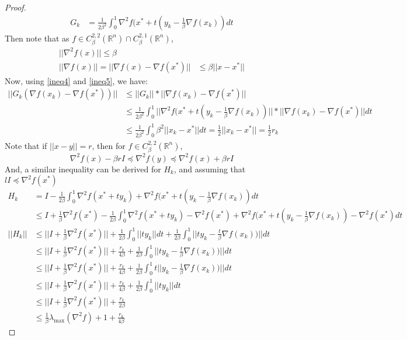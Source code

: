 \documentclass[12pt,twoside]{article}
\begin{document}
\begin{proof}
\begin{equation}
\begin{aligned}
G_k &= \frac{1}{2\beta^2} \int_0^1 \nabla^2 f(x^* + t(y_k - \frac{1}{\beta} \nabla f(x_k)) dt
\end{aligned}
\end{equation}
Then note that as $f \in C_{\beta}^{2,2}( \mathbb{R}^n) \cap  C_{\beta}^{2,1}( \mathbb{R}^n) $,
\begin{align} \label{ineq4}
|| \nabla^2 f(x) || \leq \beta \\
|| \nabla f(x) || = || \nabla f(x) - \nabla f(x^*) ||& \leq  \beta || x - x^* ||  \label{ineq5}
\end{align}
Now, using \eqref{ineq4} and \eqref{ineq5}, we have:
\begin{equation}
\begin{aligned}
|| G_k ( \nabla f(x_k)  - \nabla f(x^*) ) || &\leq || G_k ||* ||  \nabla f(x_k)  - \nabla f(x^* )|| \\
& \leq  \frac{1}{2\beta^2} \int_0^1 || \nabla^2 f(x^* + t(y_k - \frac{1}{\beta} \nabla f(x_k)) || * ||  \nabla f(x_k)  - \nabla f(x^*) ||  dt \\
& \leq \frac{1}{2 \beta^2} \int_{0}^1 \beta^2 || x_k -  x^* || dt =\frac{1}{2} || x_k - x^* ||  = \frac{1}{2}	r_k
\end{aligned}
\end{equation}
Note that if $|| x -y || = r$, then for $f \in C_{\beta}^{2,2}( \mathbb{R}^n)$,
\begin{equation}
 \nabla^2 f(x) - \beta r I \preceq  \nabla^2 f(y) \preceq \nabla^2 f(x) + \beta r I
\end{equation}
And, a similar inequality can be derived for $H_k$, and assuming that $l I \preceq \nabla^2 f(x^*)$
\begin{equation}
\begin{aligned}
 H_k &= I -  \frac{1}{2\beta} \int_0^1 \nabla^2 f(x^* + ty_k) + \nabla^2 f(x^* + t(y_k - \frac{1}{\beta} \nabla f(x_k)) dt 	\\
 & \leq I + \frac{1}{\beta} \nabla^2 f(x^*) - \frac{1}{2 \beta}   \int_0^1 \nabla^2 f(x^* + ty_k) -  \nabla^2 f(x^*) + \nabla^2 f(x^* + t(y_k - \frac{1}{\beta} \nabla f(x_k)) -  \nabla^2 f(x^*) dt \\
 ||H_k ||&  \leq || I + \frac{1}{\beta}\nabla^2 f(x^*) || + \frac{1}{2\beta} \int_0^1 || ty_k || dt	 + \frac{1}{2\beta} \int_0^1 ||	t y_k - \frac{t}{\beta} \nabla f(x_k))	|| dt \\
 & \leq  || I + \frac{1}{\beta}\nabla^2 f(x^*) || +  \frac{r_k}{4 \beta} + \frac{1}{2\beta} \int_0^1 ||	t y_k - \frac{t}{\beta} \nabla f(x_k))	|| dt \\
 & \leq  || I + \frac{1}{\beta}\nabla^2 f(x^*) || +  \frac{r_k}{4 \beta} + \frac{1}{2\beta} \int_0^1 t || y_k - \frac{1}{\beta} \nabla f(x_k))	|| dt \\
 & \leq  || I + \frac{1}{\beta}\nabla^2 f(x^*) || +  \frac{r_k}{4 \beta} + \frac{1}{2\beta} \int_0^1 ||	t y_k || dt   \\
 & \leq  || I + \frac{1}{\beta}\nabla^2 f(x^*) || +  \frac{r_k}{2 \beta} \\
 & \leq \frac{1}{\beta}  \lambda_{\max}(\nabla^2 f) + 1 + \frac{r_k}{4\beta}
\end{aligned}
\end{equation}


\end{proof}
\end{document}
